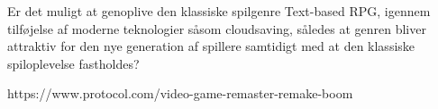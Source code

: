 Er det muligt at genoplive den klassiske spilgenre Text-based RPG, igennem tilføjelse af moderne teknologier såsom cloudsaving, således at genren bliver attraktiv for den nye generation af spillere samtidigt med at den klassiske spiloplevelse fastholdes?
\newpage


https://www.protocol.com/video-game-remaster-remake-boom